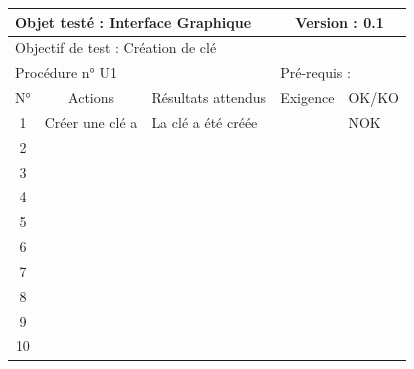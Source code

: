 \documentclass{../res/univ-projet}
\begin{document}
\begin{center}
    \begin{tabular}{|c|p{5cm}|p{5cm}|p{1.5cm}|p{1.5cm}|}
      \hline
      \multicolumn{3}{|l|}{Objet testé : Interface Graphique} & \multicolumn{2}{c|}{Version : 0.1}\\ \hline
      \multicolumn{5}{|l|}{Objectif de test : Création de clé}\\ \hline
      \multicolumn{3}{|l|}{Procédure n° U1} & \multicolumn{2}{p{3cm}|}{Pré-requis : }\\ \hline
      \multicolumn{1}{|c|}{N°} & \multicolumn{1}{c|}{Actions} & \multicolumn{1}{c|}{Résultats attendus} & 
      \multicolumn{1}{c|}{Exigence} & \multicolumn{1}{c|}{OK/KO}\\ \hline
      1 & Créer une clé a & La clé a été créée &  & NOK \\
      2 &  &  &  & \\
      3 &  &  &  & \\ 
      4 &  &  &  & \\
      5 &  &  &  & \\
      6 &  &  &  & \\
      7 &  &  &  & \\
      8 &  &  &  & \\
      9 &  &  &  & \\
      10 &  &  &  &\\ 
	\hline
    \end{tabular}
    \vskip 2.2cm



\end{center}
\end{document}
